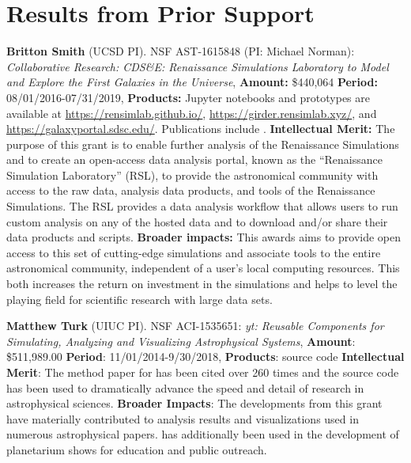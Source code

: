 \section{Results from Prior Support}

\noindent \textbf{Britton Smith} (UCSD PI). NSF AST-1615848 (PI: Michael
Norman): \textit{Collaborative Research: CDS\&E: Renaissance Simulations
Laboratory to Model and Explore the First Galaxies in the Universe},
\textbf{Amount:} \$440,064
\textbf{Period:} 08/01/2016-07/31/2019,
\textbf{Products:} Jupyter notebooks and prototypes are available at
\url{https://rensimlab.github.io/}, \url{https://girder.rensimlab.xyz/}, 
and \url{https://galaxyportal.sdsc.edu/}.  Publications include
\citep{2016ApJ...832L...5X, 2016ApJ...833...84X, Barrow17_FL2,
2017ApJ...845...47T, 2017ApJ...847...59H}.
\textbf{Intellectual Merit:} The purpose of this
grant is to enable further analysis of the Renaissance
Simulations \citep{2015ApJ...807L..12O} and to create an open-access
data analysis portal, known as the ``Renaissance Simulation
Laboratory'' (RSL), to provide the astronomical community with access
to the raw data, analysis data products, and tools of the Renaissance
Simulations.  The RSL provides a data analysis workflow that allows users to
run custom analysis on any of the hosted data and to download and/or
share their data products and scripts.
\textbf{Broader impacts:}
This awards aims to provide open access to this set of cutting-edge
simulations and associate tools to the entire astronomical community,
independent of a user's local computing resources.  This both
increases the return on investment in the simulations and helps to
level the playing field for scientific research with large data sets.

\noindent \textbf{Matthew Turk} (UIUC PI).  
NSF ACI-1535651: \textit{yt: Reusable Components for Simulating,
Analyzing and Visualizing Astrophysical Systems},
\textbf{Amount}: \$511,989.00
\textbf{Period}: 11/01/2014-9/30/2018,
\textbf{Products}: \yt{} source code
\textbf{Intellectual Merit}: The method paper for \yt{} has been cited over
260 times and the source code has been used to dramatically advance the speed
and detail of research in astrophysical sciences.
\textbf{Broader Impacts}: The developments from this grant have materially
contributed to analysis results and visualizations used in numerous
astrophysical papers. \yt{} has additionally been used in the development
of planetarium shows for education and public outreach.
